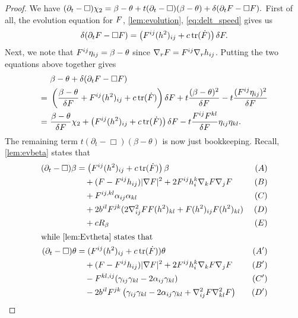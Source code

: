 \documentclass{amsart}
\begin{document}
\begin{proof}
We have
$
(\partial_t - \Box)\chi_2 = \beta - \theta + t(\partial_{t} - \Box)(\beta - \theta) + \delta(\partial_t F - \Box F).
$
First of all, the evolution equation for \(F\), \cref{lem:evolution}, \cref{eq:delt_speed} gives us
\[
\delta(\partial_t F - \Box F) = \left(F^{ij}(h^2)_{ij} + c\operatorname{tr}(\dot{F})\right)\delta F.
\]
Next, we note that
$
F^{ij} \eta_{ij} = \beta - \theta
$
since \(\nabla_r F = F^{ij} \nabla_r h_{ij}\). Putting the two equations above together gives
\begin{equation}
\label{eq:deltchi1}
\begin{split}
&\beta - \theta + \delta(\partial_t F - \Box F) \\
=\ &\left(\frac{\beta-\theta}{\delta F} + F^{ij}(h^2)_{ij} + c\operatorname{tr}(\dot{F})\right)\delta F + t \frac{(\beta - \theta)^2}{\delta F} - t \frac{(F^{ij}\eta_{ij})^2}{\delta F} \\
=\ &\frac{\beta-\theta}{\delta F} \chi_2 + \left(F^{ij}(h^2)_{ij} + c\operatorname{tr}(\dot{F})\right)\delta F  - t \frac{F^{ij}F^{kl}}{\delta F} \eta_{ij}\eta_{kl}.
\end{split}
\end{equation}
The remaining term \(t(\partial_{t} - \Box)(\beta - \theta)\) is now just bookkeeping. Recall, \cref{lem:evbeta} states that
\begin{align*}
(\partial_{t} - \Box)\beta &= \left(\p^{ij}(h^2)_{ij} + c\operatorname{tr}(\dot{\p}) \right)\beta  & (A) \\
&\quad + (\p - \p^{ij}h_{ij}) |\nabla\p|^{2} + 2\p^{ij}h^{k}_{i}\nabla_k \p \nabla_j \p  & (B) \\
&\quad + \p^{ij,kl} \a_{ij} \a_{kl} & (C) \\
&\quad + 2b^{il}\p^{jk} (2\nabla^2_{ij}\p\p(h^2)_{kl} + \p(h^2)_{ij}\p(h^2)_{kl}) & (D) \\
&\quad + cR_{\beta}  & (E) \\
\intertext{while \cref{lem:Evtheta} states that}
(\partial_{t} - \Box)\theta &= (\p^{ij}(h^2)_{ij} + c\operatorname{tr}(\dot{\p}))\theta & (A') \\
&\quad + (\p - \p^{ij}h_{ij})|\nabla\p|^{2} + 2\p^{ij}h^{k}_{i}\nabla_k\p\nabla_j\p & (B') \\
&\quad - \p^{kl,ij} (\gamma_{ij}\gamma_{kl}  - 2\a_{ij} \gamma_{kl}) & (C') \\
&\quad - 2b^{il} \p^{jk} \left(\gamma_{ij} \gamma_{kl} - 2\a_{ij} \gamma_{kl} + \nabla^2_{ij}\p\nabla^2_{kl}\p\right) & (D') \\

\end{align*}
\end{proof}
\end{document}
